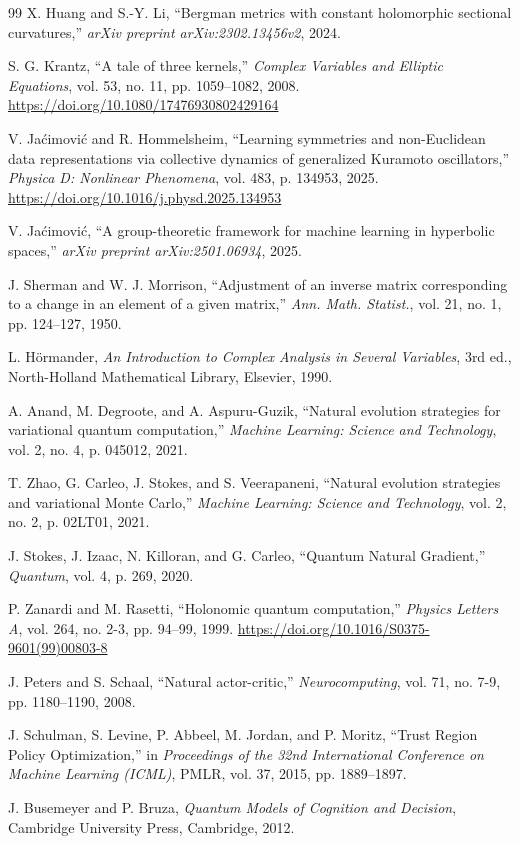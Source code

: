 \documentclass{article}
\theoremstyle{plain}%
\theoremstyle{definition}
\theoremstyle{remark}
\theoremstyle{prop}
\begin{document}
\begin{thebibliography}{99}
X. Huang and S.-Y. Li, ``Bergman metrics with constant holomorphic sectional curvatures,'' \emph{arXiv preprint arXiv:2302.13456v2}, 2024.

S. G. Krantz, ``A tale of three kernels,'' \emph{Complex Variables and Elliptic Equations}, vol. 53, no. 11, pp. 1059--1082, 2008. \url{https://doi.org/10.1080/17476930802429164}

V. Jaćimović and R. Hommelsheim, ``Learning symmetries and non-Euclidean data representations via collective dynamics of generalized Kuramoto oscillators,'' \emph{Physica D: Nonlinear Phenomena}, vol. 483, p. 134953, 2025. \url{https://doi.org/10.1016/j.physd.2025.134953}

V. Jaćimović, ``A group-theoretic framework for machine learning in hyperbolic spaces,'' \emph{arXiv preprint arXiv:2501.06934}, 2025.

J. Sherman and W. J. Morrison, ``Adjustment of an inverse matrix corresponding to a change in an element of a given matrix,'' \emph{Ann. Math. Statist.}, vol. 21, no. 1, pp. 124--127, 1950.

L. Hörmander, \emph{An Introduction to Complex Analysis in Several Variables}, 3rd ed., North-Holland Mathematical Library, Elsevier, 1990.

A. Anand, M. Degroote, and A. Aspuru-Guzik, ``Natural evolution strategies for variational quantum computation,'' \emph{Machine Learning: Science and Technology}, vol. 2, no. 4, p. 045012, 2021.

T. Zhao, G. Carleo, J. Stokes, and S. Veerapaneni, ``Natural evolution strategies and variational Monte Carlo,'' \emph{Machine Learning: Science and Technology}, vol. 2, no. 2, p. 02LT01, 2021.

J. Stokes, J. Izaac, N. Killoran, and G. Carleo, ``Quantum Natural Gradient,'' \emph{Quantum}, vol. 4, p. 269, 2020.

P. Zanardi and M. Rasetti, ``Holonomic quantum computation,'' \emph{Physics Letters A}, vol. 264, no. 2-3, pp. 94--99, 1999. \url{https://doi.org/10.1016/S0375-9601(99)00803-8}

J. Peters and S. Schaal, ``Natural actor-critic,'' \emph{Neurocomputing}, vol. 71, no. 7-9, pp. 1180--1190, 2008.

J. Schulman, S. Levine, P. Abbeel, M. Jordan, and P. Moritz, ``Trust Region Policy Optimization,'' in \emph{Proceedings of the 32nd International Conference on Machine Learning (ICML)}, PMLR, vol. 37, 2015, pp. 1889--1897.

J. Busemeyer and P. Bruza, \emph{Quantum Models of Cognition and Decision}, Cambridge University Press, Cambridge, 2012.

\end{thebibliography}
\end{document}
